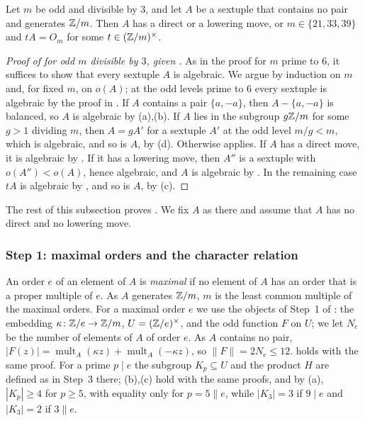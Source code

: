 \begin{theorem}\label{thm:moves}
Let $m$ be odd and divisible by $3$, and let $A$ be a sextuple that contains
no pair and generates $\mathbb{Z}/m$. Then $A$ has a direct or a lowering move, or
$m\in\{21,33,39\}$ and $tA=O_{m}$ for some $t\in(\mathbb{Z}/m)^{\times}$.
\end{theorem}

\begin{proof}[Proof of  for odd $m$ divisible by $3$, given
]
As in the proof for $m$ prime to $6$, it suffices to show that every
sextuple $A$ is algebraic. We argue by induction on $m$ and, for fixed $m$,
on $o(A)$; at the odd levels prime to $6$ every sextuple is algebraic by the
proof in . If $A$ contains a pair $\{a,-a\}$, then
$A-\{a,-a\}$ is balanced, so $A$ is algebraic by (a),(b).
If $A$ lies in the subgroup $g\mathbb{Z}/m$ for some $g>1$ dividing $m$, then
$A=gA'$ for a sextuple $A'$ at the odd level $m/g<m$, which is algebraic,
and so is $A$, by (d). Otherwise 
applies. If $A$ has a direct move, it is algebraic by . If it
has a lowering move, then $A''$ is a sextuple with $o(A'')<o(A)$, hence
algebraic, and $A$ is algebraic by . In the remaining case
$tA$ is algebraic by , and so is $A$, by
(c).
\end{proof}

The rest of this subsection proves . We fix $A$ as there and
assume that $A$ has no direct and no lowering move.

\subsubsection*{Step 1: maximal orders and the character relation}
An order $e$ of an element of $A$ is \emph{maximal} if no element of $A$ has
an order that is a proper multiple of $e$. As $A$ generates $\mathbb{Z}/m$, $m$ is
the least common multiple of the maximal orders. For a maximal order $e$ we
use the objects of Step~1 of : the embedding
$\kappa\colon\mathbb{Z}/e\to\mathbb{Z}/m$, $U=(\mathbb{Z}/e)^{\times}$, and the odd function $F$
on $U$; we let $N_{e}$ be the number of elements of $A$ of order $e$. As $A$
contains no pair, $|F(z)|=\operatorname{mult}_{A}(\kappa z)+
\operatorname{mult}_{A}(-\kappa z)$, so $\|F\|=2N_{e}\le12$.  holds with the same proof. For a prime
$p\mid e$ the subgroup $K_{p}\subseteq U$ and the product $H$ are defined as
in Step~3 there; (b),(c) hold with the same proofs, and by
(a), $|K_{p}|\ge4$ for $p\ge5$, with equality only for
$p=5\parallel e$, while $|K_{3}|=3$ if $9\mid e$ and $|K_{3}|=2$ if
$3\parallel e$.


